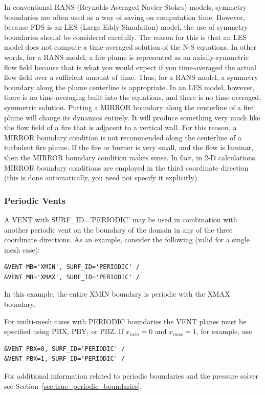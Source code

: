 \documentclass[11pt]{book}
\begin{document}
In conventional RANS (Reynolds-Averaged Navier-Stokes) models, symmetry boundaries are often used as a way of saving on computation time. However, because FDS is an LES (Large Eddy Simulation) model, the use of symmetry boundaries should be considered carefully. The reason for this is that an LES model does not compute a time-averaged solution of the N-S equations. In other words, for a RANS model, a fire plume is represented as an axially-symmetric flow field because that is what you would expect if you time-averaged the actual flow field over a sufficient amount of time. Thus, for a RANS model, a symmetry boundary along the plume centerline is appropriate. In an LES model, however, there is no time-averaging built into the equations, and there is no time-averaged, symmetric solution. Putting a {\ct MIRROR} boundary along the centerline of a fire plume will change its dynamics entirely. It will produce something very much like the flow field of a fire that is adjacent to a vertical wall. For this reason, a {\ct MIRROR} boundary condition is not recommended along the centerline of a turbulent fire plume. If the fire or burner is very small, and the flow is laminar, then the {\ct MIRROR} boundary condition makes sense. In fact, in 2-D calculations, {\ct MIRROR} boundary conditions are employed in the third coordinate direction (this is done automatically, you need not specify it explicitly).

\subsubsection{Periodic Vents}
\label{sec:periodic}

A {\ct VENT} with {\ct SURF\_ID='PERIODIC'} may be used in combination with another periodic vent on the boundary of the domain in any of the three coordinate directions.  As an example, consider the following (valid for a single mesh case):

\begin{lstlisting}
&VENT MB='XMIN', SURF_ID='PERIODIC' /
&VENT MB='XMAX', SURF_ID='PERIODIC' /
\end{lstlisting}
In this example, the entire {\ct XMIN} boundary is periodic with the {\ct XMAX} boundary.

For multi-mesh cases with {\ct PERIODIC} boundaries the {\ct VENT} planes must be specified using {\ct PBX}, {\ct PBY}, or {\ct PBZ}.  If $x_{\si{min}}=0$ and $x_{\si{max}}=1$, for example, use
\begin{lstlisting}
&VENT PBX=0, SURF_ID='PERIODIC' /
&VENT PBX=1, SURF_ID='PERIODIC' /
\end{lstlisting}
For additional information related to periodic boundaries and the pressure solver see Section~\ref{sec:true_periodic_boundaries}.
\end{document}
